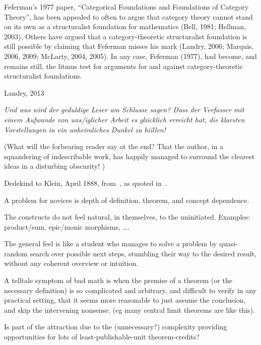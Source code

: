 \documentclass[11pt]{book}
\begin{document}
\epigraph{
Feferman’s 1977 paper, ``Categorical Foundations and Foundations
of Category Theory'', has been appealed to often to argue 
that category theory cannot stand
on its own as a structuralist foundation for mathematics
(Bell, 1981; Hellman, 2003).
Others have argued that a category-theoretic structuralist 
foundation is still possible by
claiming that Feferman misses his mark 
(Landry, 2006; Marquis, 2006, 2009; McLarty,
2004, 2005). 
In any case, Feferman (1977), had become, and remains still, 
the litmus test for arguments for and against category-theoretic
 structuralist foundations.}
 {Landry, 2013~\cite{landry_2013_feferman}}
\label{sec:Complexity}

\epigraph{
\textsl{Und was wird der geduldige Leser am
Schlusse sagen? Dass der Verfasser mit einem Aufwande von uns/iglicher Arbeit es gliicklich
erreicht hat, die klarsten Vorstellungen in ein unheimliches Dunkel zu hiillen!}
\par
(What will the forbearing reader say at the end? That the author,
 in a squandering of indescribable work, 
 has happily managed to surround 
the clearest ideas in a disturbing obscurity!
)}%
{Dedekind to Klein, April 1888, 
from~\cite{dugac_1976_dedekind_fondements},
as quoted in~\cite{ferreiros2007labyrinth}.}

A problem for novices is depth of definition, theorem,
and concept dependence.


The constructs do not feel natural, in themselves, 
to the uninitiated.
Examples: product/sum, epic/monic morphisms, {\ldots}.

The general feel is like a student who manages to solve a problem
by quasi-random search over possible next steps,
stumbling their way to the desired result,
without any coherent overview or intuition.

A telltale symptom of bad math is when the premise of a theorem
(or the necessary definition) is so complicated and arbitrary,
and difficult to verify in any practical setting,
that it seems more reasonable to just assume the conclusion,
and skip the intervening nonsense.
(eg many central limit theorems are like this).

Is part of the attraction due to the (unnecessary?)
complexity providing opportunities for lots of
least-publishable-unit 
theorem-credits?~\cite{jaffe_1993_theoretical,thurston_1994_proof}
\end{document}

